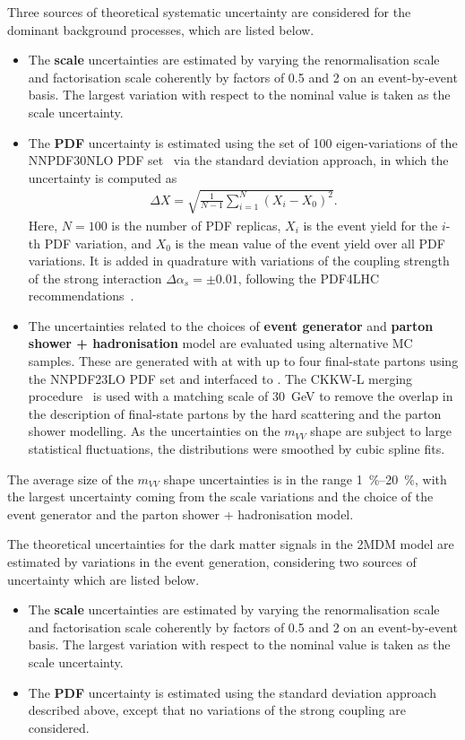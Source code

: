 Three sources of theoretical systematic uncertainty are considered for the dominant \vjets background processes, which are listed below.
\begin{itemize}
  \item The \textbf{scale} uncertainties are estimated by varying the renormalisation scale \muR and factorisation scale \muF coherently by factors of \num{0.5} and \num{2} on an event-by-event basis. The largest variation with respect to the nominal value is taken as the scale uncertainty.
  \item The \textbf{PDF} uncertainty is estimated using the set of 100 eigen-variations of the \textsc{NNPDF30NLO} PDF set~\cite{Ball2015} via the standard deviation approach, in which the uncertainty is computed as
  \begin{align}
    \Delta X = \sqrt{\frac{1}{N-1} \sum_{i=1}^{N} (X_{i} - X_{0})^2}.
  \end{align}
Here, \(N=100\) is the number of PDF replicas, \(X_{i}\) is the event yield for the \(i\)-th PDF variation, and \(X_{0}\) is the mean value of the event yield over all PDF variations. It is added in quadrature with variations of the coupling strength of the strong interaction \(\Delta \alpha_{s} = \pm 0.01\), following the \textsc{PDF4LHC} recommendations~\cite{Butterworth:2015oua}.
  \item The uncertainties related to the choices of \textbf{event generator} and \textbf{parton shower + hadronisation} model are evaluated using alternative MC samples. These are generated with  at \LO with up to four final-state partons using the \textsc{NNPDF23LO} PDF set and interfaced to . The CKKW-L merging procedure~\cite{Lnnblad2002,Lnnblad2012} is used with a matching scale of \SI{30}{\giga\electronvolt} to remove the overlap in the description of final-state partons by the hard scattering and the parton shower modelling. As the uncertainties on the \(m_{VV}\) shape are subject to large statistical fluctuations, the distributions were smoothed by cubic spline fits.
\end{itemize}

The average size of the \(m_{VV}\) shape uncertainties is in the range \SIrange{1}{20}{\percent}, with the largest uncertainty coming from the scale variations and the choice of the event generator and the parton shower + hadronisation model.


The theoretical uncertainties for the dark matter signals in the 2MDM model are estimated by variations in the event generation, considering two sources of uncertainty which are listed below.
\begin{itemize}
  \item The \textbf{scale} uncertainties are estimated by varying the renormalisation scale \muR and factorisation scale \muF coherently by factors of \num{0.5} and \num{2} on an event-by-event basis. The largest variation with respect to the nominal value is taken as the scale uncertainty.
  \item The \textbf{PDF} uncertainty is estimated using the standard deviation approach described above, except that no variations of the strong coupling are considered.
\end{itemize}

